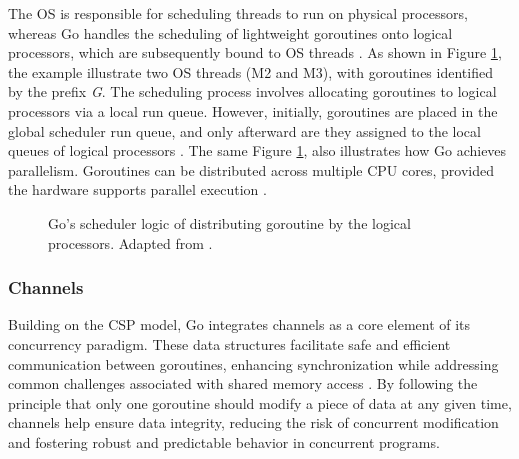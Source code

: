 The \gls{OS} is responsible for scheduling threads to run on physical processors, whereas Go handles the scheduling of lightweight goroutines onto logical processors, which are subsequently bound to \gls{OS} threads \cite{Kennedy2016}. As shown in Figure \ref{fig:gorutine-threads-relation}, the example illustrate two \gls{OS} threads (M2 and M3), with goroutines identified by the prefix \textit{G}. The scheduling process involves allocating goroutines to logical processors via a local run queue. However, initially, goroutines are placed in the global scheduler run queue, and only afterward are they assigned to the local queues of logical processors \cite{Kennedy2016,Cox-Buday2017}. The same Figure \ref{fig:gorutine-threads-relation}, also illustrates how Go achieves parallelism. Goroutines can be distributed across multiple CPU cores, provided the hardware supports parallel execution \cite{Kennedy2016}.

\begin{figure}
    \centering
    \caption[Go’s scheduler logic of distributing goroutine by the logical processors]{Go’s scheduler logic of distributing goroutine by the logical processors. Adapted from \cite{Kennedy2016}.}
    \label{fig:gorutine-threads-relation}
\end{figure}

\subsubsection{Channels}

Building on the \gls{CSP} model, Go integrates channels as a core element of its concurrency paradigm. These data structures facilitate safe and efficient communication between goroutines, enhancing synchronization while addressing common challenges associated with shared memory access \cite{Kennedy2016}. By following the principle that only one goroutine should modify a piece of data at any given time, channels help ensure data integrity, reducing the risk of concurrent modification and fostering robust and predictable behavior in concurrent programs.

